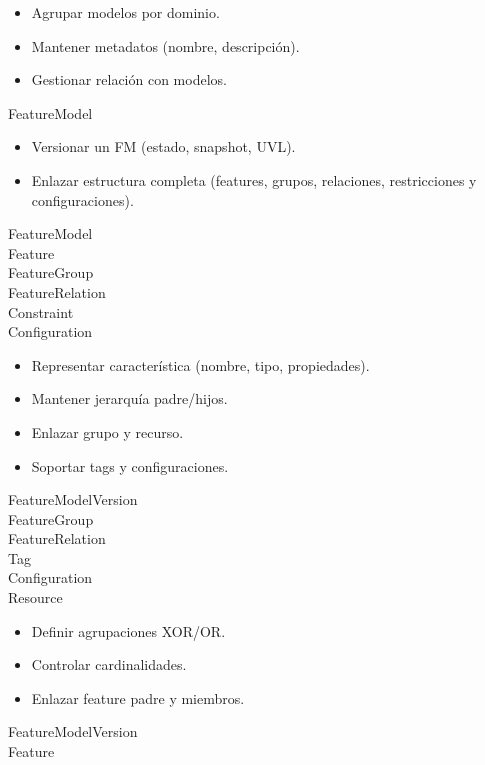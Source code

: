 \begin{addendum}
		\begin{crccard}
			\crcresp
			{
				\begin{itemize}
				\item Agrupar modelos por dominio.
				\item Mantener metadatos (nombre, descripción).
				\item Gestionar relación con modelos.
				\end{itemize}
			}
			\crccolab
			{
				FeatureModel
			}
		\end{crccard}

		\begin{crccard}
			\crcresp
			{
				\begin{itemize}
				\item Versionar un \ac{FM} (estado, snapshot, \ac{UVL}).
				\item Enlazar estructura completa (features, grupos, relaciones, restricciones y configuraciones).
				\end{itemize}
			}
			\crccolab
			{
				FeatureModel\\
				Feature\\
				FeatureGroup\\
				FeatureRelation\\
				Constraint\\
				Configuration
			}
		\end{crccard}

		\begin{crccard}
			\crcresp
			{
				\begin{itemize}
				\item Representar característica (nombre, tipo, propiedades).
				\item Mantener jerarquía padre/hijos.
				\item Enlazar grupo y recurso.
				\item Soportar tags y configuraciones.
				\end{itemize}
			}
			\crccolab
			{
				FeatureModelVersion\\
				FeatureGroup\\
				FeatureRelation\\
				Tag\\
				Configuration\\
				Resource
			}
		\end{crccard}

		\begin{crccard}
			\crcresp
			{
				\begin{itemize}
				\item Definir agrupaciones XOR/OR.
				\item Controlar cardinalidades.
				\item Enlazar feature padre y miembros.
				\end{itemize}
			}
			\crccolab
			{
				FeatureModelVersion\\
				Feature
			}
		\end{crccard}


\end{addendum}

